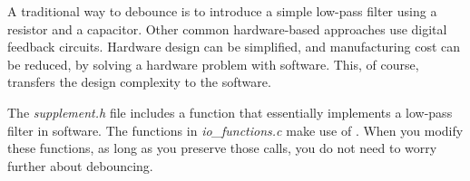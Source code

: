 %
%
%
%

A traditional way to debounce is to introduce a simple low-pass filter using a resistor and a capacitor.
Other common hardware-based approaches use digital feedback circuits.
Hardware design can be simplified, and manufacturing cost can be reduced, by solving a hardware problem with software.
This, of course, transfers the design complexity to the software.

The \textit{supplement.h} file includes a  function that essentially implements a low-pass filter in software.
The functions in \textit{io\_functions.c} make use of .
When you modify these functions, as long as you preserve those  calls, you do not need to worry further about debouncing.
